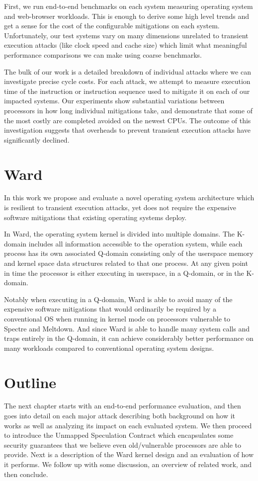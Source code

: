 First, we run end-to-end benchmarks on each system measuring operating system and web-browser workloads.
This is enough to derive some high level trends and get a sense for the cost of the configurable mitigations on each system.
Unfortunately, our test systems vary on many dimensions unrelated to transient execution attacks (like clock speed and cache size) which limit what meaningful performance comparisons we can make using coarse benchmarks.

The bulk of our work is a detailed breakdown of individual attacks where we can investigate precise cycle costs.
For each attack, we attempt to measure execution time of the instruction or instruction sequence used to mitigate it on each of our impacted systems.
Our experiments show substantial variations between processors in how long individual mitigations take, and demonstrate that some of the most costly are completed avoided on the newest CPUs. 
The outcome of this investigation suggests that overheads to prevent transient execution attacks have significantly declined.

\section{Ward}
In this work we propose and evaluate a novel operating system architecture which is resilient to transient execution attacks, yet does not require the expensive software mitigations that existing operating systems deploy. 

In Ward, the operating system kernel is divided into multiple domains.
The K-domain includes all information accessible to the operation system, while each process has its own associated Q-domain consisting only of the userspace memory and kernel space data structures related to that one process.
At any given point in time the processor is either executing in userspace, in a Q-domain, or in the K-domain. 

Notably when executing in a Q-domain, Ward is able to avoid many of the expensive software mitigations that would ordinarily be required by a conventional OS when running in kernel mode on processors vulnerable to Spectre and Meltdown.
And since Ward is able to handle many system calls and traps entirely in the Q-domain, it can achieve considerably better performance on many workloads compared to conventional operating system designs.

\section{Outline}
The next chapter starts with an end-to-end performance evaluation, and then goes into detail on each major attack describing both background on how it works as well as analyzing its impact on each evaluated system.
We then proceed to introduce the Unmapped Speculation Contract which encapsulates some security guarantees that we believe even old/vulnerable processors are able to provide.
Next is a description of the Ward kernel design and an evaluation of how it performs.
We follow up with some discussion, an overview of related work, and then conclude.